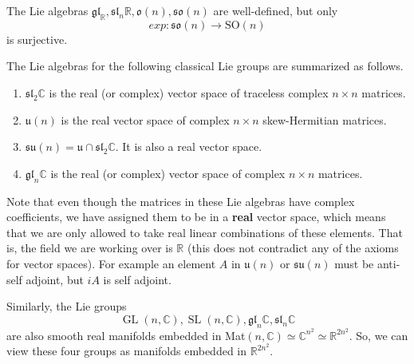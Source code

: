 \documentclass{article}
\DeclareMathOperator{\GL}{GL}
\DeclareMathOperator{\SL}{SL}
\begin{document}
      \begin{theorem}
        The Lie algebras $\mathfrak{gl}_ \mathbb{R}, \mathfrak{sl}_n \mathbb{R}, \mathfrak{o}(n), \mathfrak{so}(n)$ are well-defined, but only 
        \begin{equation}
          exp: \mathfrak{so}(n) \longrightarrow \text{SO}(n)
        \end{equation}
        is surjective. 
      \end{theorem}

      \begin{theorem}
        The Lie algebras for the following classical Lie groups are summarized as follows. 
        \begin{enumerate}
          \item $\mathfrak{sl}_2 \mathbb{C}$ is the real (or complex) vector space of traceless complex $n \times n$ matrices. 
          \item $\mathfrak{u}(n)$ is the real vector space of complex $n \times n$ skew-Hermitian matrices. 
          \item $\mathfrak{su}(n) = \mathfrak{u} \cap \mathfrak{sl}_2 \mathbb{C}$. It is also a real vector space. 
          \item $\mathfrak{gl}_n \mathbb{C}$ is the real (or complex) vector space of complex $n \times n$ matrices. 
        \end{enumerate}
        Note that even though the matrices in these Lie algebras have complex coefficients, we have assigned them to be in a \textbf{real} vector space, which means that we are only allowed to take real linear combinations of these elements. That is, the field we are working over is $\mathbb{R}$ (this does not contradict any of the axioms for vector spaces). For example an element $A$ in $\mathfrak{u}(n)$ or $\mathfrak{su}(n)$ must be anti-self adjoint, but $iA$ is self adjoint. 
      \end{theorem}

      Similarly, the Lie groups 
      \begin{equation}
        \GL(n, \mathbb{C}), \SL(n, \mathbb{C}), \mathfrak{gl}_n \mathbb{C}, \mathfrak{sl}_n \mathbb{C}
      \end{equation}
      are also smooth real manifolds embedded in Mat$(n, \mathbb{C}) \simeq \mathbb{C}^{n^2} \simeq \mathbb{R}^{2 n^2}$. So, we can view these four groups as manifolds embedded in $\mathbb{R}^{2 n^2}$. 
\end{document}
